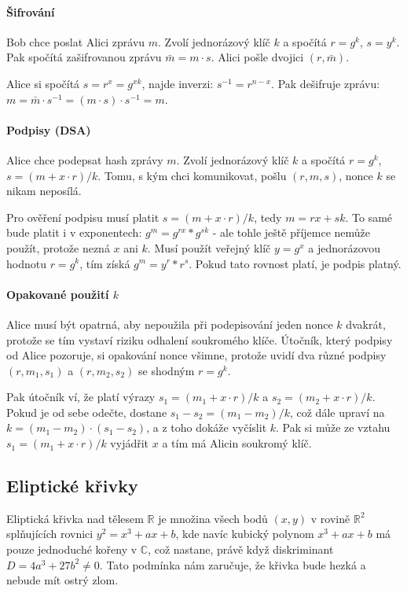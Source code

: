 \paragraph{Šifrování} Bob chce poslat Alici zprávu $m$. Zvolí jednorázový klíč $k$
a spočítá $r=g^k$, $s=y^k$. Pak spočítá zašifrovanou zprávu $\bar{m} = m \cdot s$.
Alici pošle dvojici $(r, \bar{m})$.

Alice si spočítá $s = r^x = g^{xk}$, najde inverzi: $s^{-1} = r^{n-x}$. Pak
dešifruje zprávu: $m = \bar{m} \cdot s^{-1} = (m\cdot s) \cdot s^{-1} = m$.

\paragraph{Podpisy (DSA)} Alice chce podepsat hash zprávy $m$. Zvolí jednorázový klíč $k$
a spočítá $r=g^k$, $s=(m + x\cdot r)/k$. Tomu, s kým chci komunikovat, pošlu $(r, m, s)$,
nonce $k$ se nikam neposílá.

Pro ověření podpisu musí platit $s=(m + x\cdot r)/k$, tedy $m = rx + sk$. To
samé bude platit i v exponentech: $g^m = g^{rx} * g^{sk}$ - ale tohle ještě příjemce
nemůže použít, protože nezná $x$ ani $k$. Musí použít veřejný klíč $y=g^x $ a jednorázovou
hodnotu $r = g^k$, tím získá $g^m = y^{r} * r^{s}$. Pokud tato rovnost platí, je
podpis platný.

\paragraph{Opakované použití $k$} Alice musí být opatrná, aby nepoužila při
podepisování jeden nonce $k$ dvakrát, protože se tím vystaví riziku odhalení
soukromého klíče. Útočník, který podpisy od Alice pozoruje, si opakování nonce
všimne, protože uvidí dva různé podpisy $(r, m_1, s_1)$ a $(r, m_2, s_2)$ se
shodným $r=g^k$.

Pak útočník ví, že platí výrazy $s_1=(m_1 + x\cdot r)/k$ a $s_2=(m_2 + x\cdot r)/k$.
Pokud je od sebe odečte, dostane $s_1 - s_2 = (m_1 - m_2)/k$, což dále upraví
na $k = (m_1 - m_2)\cdot(s_1 - s_2)$, a z toho dokáže vyčíslit $k$. Pak si může ze
vztahu $s_1=(m_1 + x\cdot r)/k$ vyjádřit $x$ a tím má Alicin soukromý klíč.

\subsection{Eliptické křivky}

Eliptická křivka nad tělesem $\mathbb{R}$ je množina všech bodů $(x,y)$ v rovině
$\mathbb{R}^2$ splňujících rovnici $y^2=x^3+ax+b$, kde navíc kubický polynom
$x^3+ax+b$ má pouze jednoduché kořeny v $\mathbb{C}$, což nastane, právě když
diskriminant $D=4a^3+27b^2\neq0$. Tato podmínka nám zaručuje, že křivka bude
hezká a nebude mít ostrý zlom.

